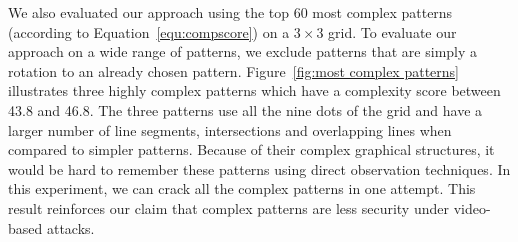        We also evaluated our approach using the top 60 most complex
        patterns (according to Equation~\ref {equ:compscore}) on a $3 \times 3$
        grid.
        To evaluate our approach on a wide range of patterns, we exclude patterns that are simply a rotation to an already chosen pattern.
         Figure~\ref {fig:most complex patterns} illustrates three
        highly complex patterns which have a complexity score between 43.8 and 46.8. The three
        patterns use all the nine dots of the grid and have a larger number of line segments, intersections and overlapping lines when compared to simpler patterns.
        Because of their complex graphical structures, it would be hard to remember
        these patterns using direct observation techniques.
        In this experiment, we can crack all the complex patterns in one attempt. This result reinforces our claim that complex
        patterns are less security under video-based attacks.




